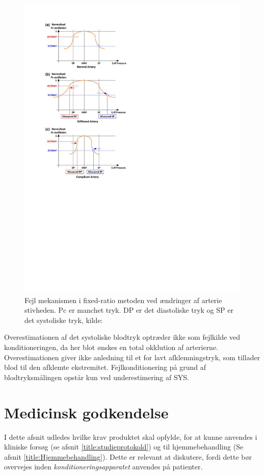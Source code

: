 \begin{minipage}[t]{0.5\textwidth}
	\begin{figure}[H]
		\centering
		\includegraphics[width=1\textwidth]{billeder/ErrorFixed-Ratio.pdf}
		\caption{Fejl mekanismen i fixed-ratio metoden ved ændringer af arterie stivheden. Pc er manchet tryk. DP er det diastoliske tryk og SP er det systoliske tryk, kilde: \cite{RefWorks:13}}\label{fig:ErrorMechanismOfFixedRatio}
	\end{figure}
\end{minipage}


Overestimationen af det systoliske blodtryk optræder ikke som fejlkilde ved konditioneringen, da her blot ønskes en total okklution af arterierne. Overestimationen giver ikke anledning til et for lavt afklemningstryk, som tillader blod til den afklemte ekstremitet. Fejlkonditionering på grund af blodtryksmålingen opstår kun ved underestimering af SYS.

\section{Medicinsk godkendelse} \label{title:medGodkendelse}
I dette afsnit udledes hvilke krav produktet skal opfylde, for at kunne anvendes i kliniske forsøg (se afsnit \ref{title:studieprotokold}) og til hjemmebehandling (Se afsnit \ref{title:Hjemmebehandling}). Dette er relevant at diskutere, fordi dette bør overvejes inden \textit{konditioneringsapparatet} anvendes på patienter.

